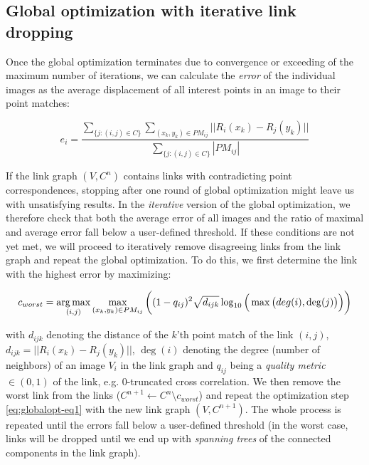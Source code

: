 \subsection*{Global optimization with iterative link dropping}

Once the global optimization terminates due to convergence or exceeding of the maximum number of iterations, we can calculate the \emph{error} of the individual images as the average displacement of all interest points in an image to their point matches:

\begin{equation}
\label{eq:gloablopt-eq2}
e_i = \frac{\sum_{\{j: (i,j) \in C\}}  \sum_{(x_{k}, y_{k}) \in PM_{ij}} || R_{i}( x_{k}) - R_{j}( y_{k}) ||  }{ \sum_{\{j: (i,j) \in C\}} |PM_{ij}| }
\end{equation}

If the link graph $(V,C^n)$ contains links with contradicting point correspondences, stopping after one round of global optimization might leave us with unsatisfying results. In the \emph{iterative} version of the global optimization, we therefore check that both the average error of all images and the ratio of maximal and average error fall below a user-defined threshold. If these conditions are not yet met, we will proceed to iteratively remove disagreeing links from the link graph and repeat the global optimization. To do this, we first determine the link with the highest error by maximizing:

\begin{equation}
\label{eq:globalopt-eq3}
c_{worst} = \operatorname*{arg\,max}_{(i,j)} \max_{(x_k, y_k) \in PM_{ij}}\bigg( (1-q_{ij})^2 \sqrt{d_{ijk}} \log_{10}\Big(\max\big(deg(i), \deg(j)\big)\Big)\bigg) 
\end{equation}

with $d_{ijk}$ denoting the distance of the $k$'th point match of the link $(i,j)$, $d_{ijk} = || R_{i}(x_k) - R_{j}(y_k) ||$, $\deg(i)$ denoting the degree (number of neighbors) of an image $V_i$ in the link graph and $q_{ij}$ being a \emph{quality metric} $\in (0,1)$ of the link, e.g. 0-truncated cross correlation. We then remove the worst link from the links ($C^{n+1} \leftarrow C^{n} \setminus c_{worst}$) and repeat the optimization step \ref{eq:globalopt-eq1} with the new link graph $(V, C^{n+1})$. The whole process is repeated until the errors fall below a user-defined threshold (in the worst case, links will be dropped until we end up with \emph{spanning trees} of the connected components in the link graph). 

